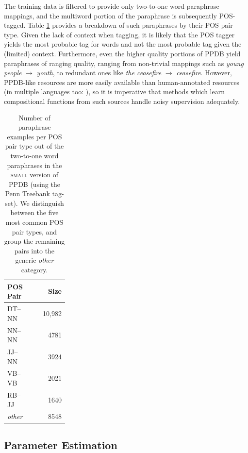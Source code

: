 \documentclass[11pt,letterpaper]{article}
\begin{document}
The training data is filtered to provide only two-to-one word paraphrase mappings, and the multiword portion of the paraphrase is subsequently POS-tagged.
Table \ref{tab:pos-stats} provides a breakdown of such paraphrases by their POS pair type.  
Given the lack of context when tagging, it is likely that the POS tagger yields the most probable tag for words and not the most probable tag given the (limited) context. 
Furthermore, even the higher quality portions of PPDB yield paraphrases of ranging quality, ranging from non-trivial mappings such as \emph{young people} $\rightarrow$ \emph{youth}, to redundant ones like \emph{the ceasefire} $\rightarrow$ \emph{ceasefire}. 
However, PPDB-like resources are more easily available than human-annotated resources (in multiple languages too: ), so it is imperative that methods which learn compositional functions from such sources handle noisy supervision adequately. 

\begin{table}[h!]
  \begin{center}
    \begin{tabular}{p{0.25\linewidth}r}
      \hline
      POS Pair & Size \\
	  \hline
      DT--NN & 10,982 \\
	  NN--NN &  4781 \\
	  JJ--NN & 3924 \\
  	  VB--VB  &  2021 \\
      RB--JJ &  1640 \\
	  \emph{other}  & 8548 \\
	\end{tabular}
  \end{center}
  \caption{Number of paraphrase examples per POS pair type out of the two-to-one word paraphrases in the \textsc{small} version of PPDB (using the Penn Treebank tag-set). We distinguish between the five most common POS pair types, and group the remaining pairs into the generic \emph{other} category.}
  \label{tab:pos-stats}
\end{table}

\subsection{Parameter Estimation}
\end{document}
